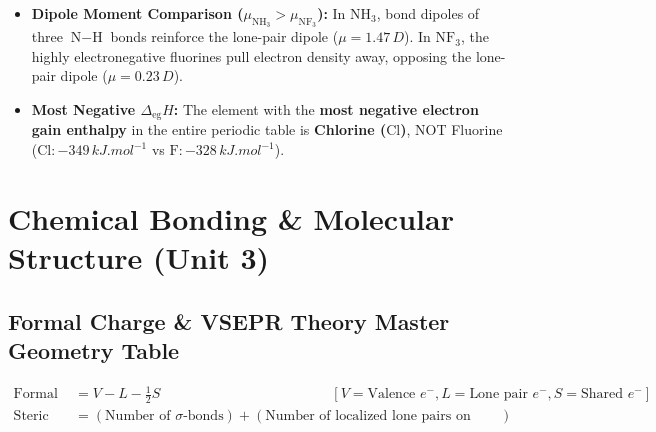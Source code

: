 \documentclass[11pt,a4paper]{article}
\begin{document}
\begin{trapbox}
\begin{itemize}
  \item \textbf{Dipole Moment Comparison ($\mu_{\text{NH}_3} > \mu_{\text{NF}_3}$):} In $\text{NH}_3$, bond dipoles of three $\text{N}-\text{H}$ bonds reinforce the lone-pair dipole ($\mu = 1.47\,\si{D}$). In $\text{NF}_3$, the highly electronegative fluorines pull electron density away, opposing the lone-pair dipole ($\mu = 0.23\,\si{D}$).
  \item \textbf{Most Negative $\Delta_{\text{eg}}H$:} The element with the \textbf{most negative electron gain enthalpy} in the entire periodic table is \textbf{Chlorine ($\text{Cl}$)}, NOT Fluorine ($\text{Cl}: -349\,\si{kJ.mol^{-1}}$ vs $\text{F}: -328\,\si{kJ.mol^{-1}}$).
\end{itemize}
\end{trapbox}

\newpage

\section{Chemical Bonding \& Molecular Structure (Unit 3)}

\subsection{Formal Charge \& VSEPR Theory Master Geometry Table}

\begin{formulabox}
\begin{align}
  \text{Formal Charge (FC)} &= V - L - \frac{1}{2}S && [V = \text{Valence } e^-, L = \text{Lone pair } e^-, S = \text{Shared } e^-] \\
  \text{Steric Number (SN)} &= (\text{Number of }\sigma\text{-bonds}) + (\text{Number of localized lone pairs on central atom})
\end{align}
\end{formulabox}
\end{document}
